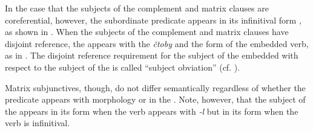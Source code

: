 \documentclass[output=paper,modfonts,newtxmath,hidelinks,]{langscibook}
\begin{document}
\noindent In the case that the subjects of the complement and matrix clauses are coreferential, however, the subordinate predicate appears in its infinitival form \citep[160, 236]{Cubberley2002}, as shown in . When the subjects of the complement and matrix clauses have disjoint reference, the  appears with the  \textit{čtoby} and the  form of the embedded verb, as in . The disjoint reference requirement for the subject of the embedded   with respect to the subject of the  is called “subject obviation” (cf. \citealt[1]{Antonenko2010}).

\ea \label{10:ex16}
	\z
\z

\ea \label{10:ex17}
	\z
\z

\noindent Matrix subjunctives, though, do not differ semantically regardless of whether the predicate appears with  morphology or in the  \citep[10]{Asarina2006}. Note, however, that the subject of the  appears in its  form when the verb appears with \textit{{}-l} but in its  form when the verb is infinitival.
\end{document}
